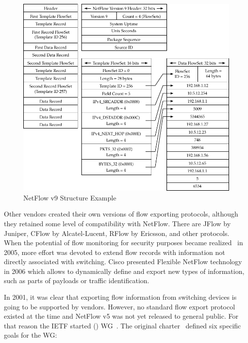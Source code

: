 \begin{figure}[t!]
  \begin{center}
    \includegraphics[width=\textwidth]{figures/nf9-protocol}
  \end{center}
  \caption{NetFlow v9 Structure Example}
  \label{fig:nf9-protocol}
\end{figure}

Other vendors created their own versions of flow exporting protocols, although they retained some level of compatibility with NetFlow. There are JFlow by Juniper, CFlow by Alcatel-Lucent, RFlow by Ericsson, and other protocols. When the potential of flow monitoring for security purposes became realized~\cite{CiscoSystems-2005-Cisco} in 2005, more effort was devoted to extend flow records with information not directly associated with switching. Cisco presented Flexible NetFlow technology~\cite{CiscoSystems-2008-Cisco} in 2006 which allows to dynamically define and export new types of information, such as parts of payloads or traffic identification.

In 2001, it was clear that exporting flow information from switching devices is going to be supported by vendors. However, no standard flow export protocol existed at the time and NetFlow v5 was not yet released to general public. For that reason the IETF started  () WG~\cite{IETF--IP}. The original charter~\cite{IESG-2001-IP} defined six specific goals for the WG: 

